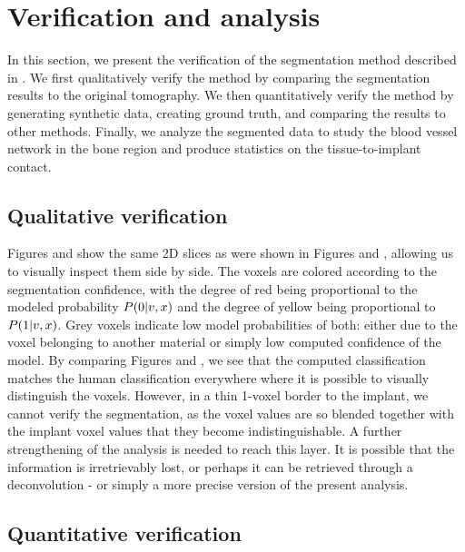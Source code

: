 \section{Verification and analysis}
\label{sec:verification}

In this section, we present the verification of the segmentation method
described in . We first qualitatively verify the method by
comparing the segmentation results to the original tomography. We then
quantitatively verify the method by generating synthetic data, creating ground
truth, and comparing the results to other methods. Finally, we analyze the
segmented data to study the blood vessel network in the bone region and produce
statistics on the tissue-to-implant contact.


\subsection{Qualitative verification}

Figures  and 
show the same 2D slices as were shown in Figures  and
, allowing us to visually inspect them side by side. The voxels
are colored according to the segmentation confidence, with the degree of red
being proportional to the modeled probability $P\!\left(0\middle\vert v,x\right)$ and the degree
of yellow being proportional to $P\!\left(1\middle\vert v,x\right)$. Grey voxels indicate low
model probabilities of both: either due to the voxel belonging to another
material or simply low computed confidence of the model. By comparing Figures
 and , we see
that the computed classification matches the human classification everywhere
where it is possible to visually distinguish the voxels. However, in a thin
1-voxel border to the implant, we cannot verify the segmentation, as the voxel
values are so blended together with the implant voxel values that they become
indistinguishable. A further strengthening of the analysis is needed to reach
this layer. It is possible that the information is irretrievably lost, or
perhaps it can be retrieved through a deconvolution - or simply a more precise
version of the present analysis.

\subsection{Quantitative verification}
